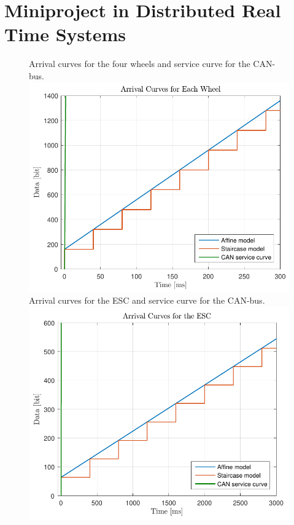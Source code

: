 
\usepackage{cancel}



\chapter{Miniproject in Distributed Real Time Systems}


%
\begin{figure}[H]
  \captionbox
  {
    Arrival curves for the four wheels and service curve for the CAN-bus.
    \label{fig:ArrivalCurvesWheels}
  }
  {
    \includegraphics[width=.46\textwidth]{figures/ArrivalCurvesWheels}
  }
  \hspace{5pt}
  \captionbox
  {
    Arrival curves for the ESC and service curve for the CAN-bus.
    \label{fig:ArrivalCurvesESC}
  }
  {
    \includegraphics[width=.46\textwidth]{figures/ArrivalCurvesESC}
  }
\end{figure}
%
%
